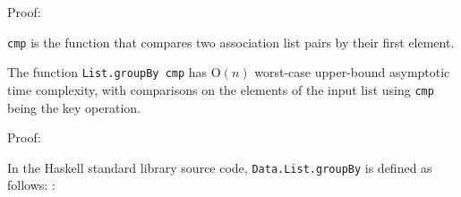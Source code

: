 \documentclass[../main.tex]{subfiles}
\begin{document}
Proof:

\texttt{cmp} is the function that compares two association list pairs by their first element.  










\begin{proposition}
	The function \texttt{List.groupBy cmp} has O$(n)$ worst-case upper-bound asymptotic time complexity, with comparisons on the elements of the input list using \texttt{cmp} being the key operation.
\end{proposition}

Proof:

In the Haskell standard library source code, \texttt{Data.List.groupBy} is defined as follows: \cite{hstdlib}:
\end{document}
